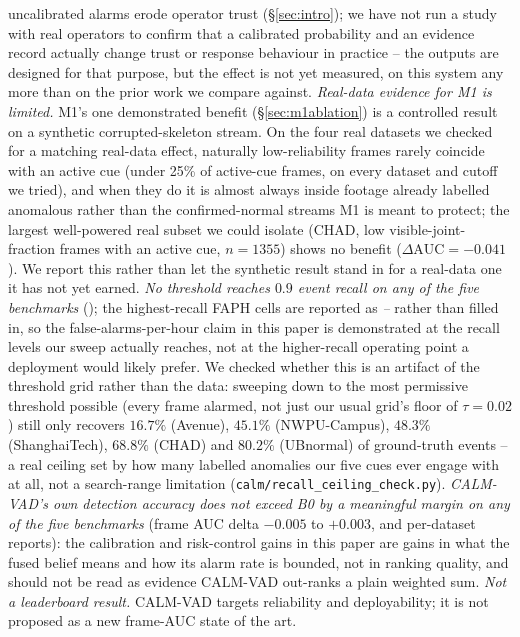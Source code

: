 \documentclass[conference]{IEEEtran}
\newcommand{\method}{CALM-VAD}
\begin{document}
uncalibrated alarms erode operator trust (\S\ref{sec:intro}); we have not run
a study with real operators to confirm that a calibrated probability and an
evidence record actually change trust or response behaviour in practice --
the outputs are designed for that purpose, but the effect is not yet
measured, on this system any more than on the prior work we compare against.
\emph{Real-data evidence for M1 is limited.} M1's one demonstrated benefit
(\S\ref{sec:m1ablation}) is a controlled result on a synthetic
corrupted-skeleton stream. On the four real datasets we checked for a
matching real-data effect, naturally low-reliability frames rarely coincide
with an active cue (under 25\% of active-cue frames, on every dataset and
cutoff we tried), and when they do it is almost always inside footage
already labelled anomalous rather than the confirmed-normal streams M1 is
meant to protect; the largest well-powered real subset we could isolate
(CHAD, low visible-joint-fraction frames with an active cue, $n{=}1355$)
shows no benefit ($\Delta\mathrm{AUC}=-0.041$). We report this rather than
let the synthetic result stand in for a real-data one it has not yet earned.
\emph{No threshold reaches $0.9$ event recall on any of the five benchmarks}
(); the highest-recall FAPH cells are reported as
\emph{--} rather than filled in, so the false-alarms-per-hour claim in this
paper is demonstrated at the recall levels our sweep actually reaches, not
at the higher-recall operating point a deployment would likely prefer. We
checked whether this is an artifact of the threshold grid rather than the
data: sweeping down to the most permissive threshold possible (every frame
alarmed, not just our usual grid's floor of $\tau{=}0.02$) still only
recovers $16.7\%$ (Avenue), $45.1\%$ (NWPU-Campus), $48.3\%$
(ShanghaiTech), $68.8\%$ (CHAD) and $80.2\%$ (UBnormal) of ground-truth
events -- a real ceiling set by how many labelled anomalies our five cues
ever engage with at all, not a search-range limitation
(\texttt{calm/recall\_ceiling\_check.py}).
\emph{CALM-VAD's own detection accuracy does not exceed B0 by a meaningful
margin on any of the five benchmarks} (frame AUC delta $-0.005$ to $+0.003$,
 and per-dataset reports): the calibration and
risk-control gains in this paper are gains in what the fused belief means
and how its alarm rate is bounded, not in ranking quality, and should not be
read as evidence \method{} out-ranks a plain weighted sum.
\emph{Not a leaderboard result.} \method{} targets reliability and
deployability; it is not proposed as a new frame-AUC state of the art.
\end{document}
